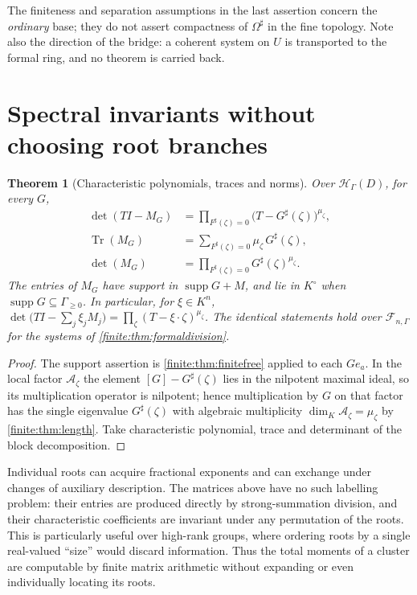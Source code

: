 \documentclass[11pt,letterpaper]{article}
\newtheorem{theorem}{Theorem}[section]
\theoremstyle{definition}
\theoremstyle{remark}
\newcommand{\HH}{\mathscr H}
\newcommand{\Af}{\mathscr F}
\newcommand{\Alg}{\mathcal A}
\newcommand{\Kc}{K^{\circ}}
\newcommand{\sh}{^{\sharp}}
\DeclareMathOperator{\supp}{supp}
\DeclareMathOperator{\Tr}{Tr}
\numberwithin{equation}{section}
\begin{document}
The finiteness and separation assumptions in the last assertion concern the \emph{ordinary} base; they do not assert compactness of $\Omega\sh$ in the fine topology. Note also the direction of the bridge: a coherent system on $U$ is transported to the formal ring, and no theorem is carried back.

\section{Spectral invariants without choosing root branches}
\label{finite:sec:spectral}

\begin{theorem}[Characteristic polynomials, traces and norms]
\label{finite:thm:spectral}
Over $\HH_\Gamma(D)$, for every $G$,
\begin{align}
 \det(TI-M_G)&=\prod_{F\sh(\zeta)=0}\bigl(T-G\sh(\zeta)\bigr)^{\mu_\zeta},
 \label{finite:eq:characteristic}\\
 \Tr(M_G)&=\sum_{F\sh(\zeta)=0}\mu_\zeta\,G\sh(\zeta),
 \label{finite:eq:trace}\\
 \det(M_G)&=\prod_{F\sh(\zeta)=0}G\sh(\zeta)^{\mu_\zeta}.
 \label{finite:eq:norm}
\end{align}
The entries of $M_G$ have support in $\supp G+M$, and lie in $\Kc$ when $\supp G\subseteq\Gamma_{\geq0}$. In particular, for $\xi\in K^n$, $\det\bigl(TI-\sum_j\xi_jM_j\bigr)=\prod_\zeta(T-\xi\cdot\zeta)^{\mu_\zeta}$. The identical statements hold over $\Af_{n,\Gamma}$ for the systems of \cref{finite:thm:formaldivision}.
\end{theorem}

\begin{proof}
The support assertion is \cref{finite:thm:finitefree} applied to each $Ge_a$. In the local factor $\Alg_\zeta$ the element $[G]-G\sh(\zeta)$ lies in the nilpotent maximal ideal, so its multiplication operator is nilpotent; hence multiplication by $G$ on that factor has the single eigenvalue $G\sh(\zeta)$ with algebraic multiplicity $\dim_K\Alg_\zeta=\mu_\zeta$ by \cref{finite:thm:length}. Take characteristic polynomial, trace and determinant of the block decomposition.
\end{proof}

Individual roots can acquire fractional exponents and can exchange under changes of auxiliary description. The matrices above have no such labelling problem: their entries are produced directly by strong-summation division, and their characteristic coefficients are invariant under any permutation of the roots. This is particularly useful over high-rank groups, where ordering roots by a single real-valued ``size'' would discard information. Thus the total moments of a cluster are computable by finite matrix arithmetic without expanding or even individually locating its roots.
\end{document}
